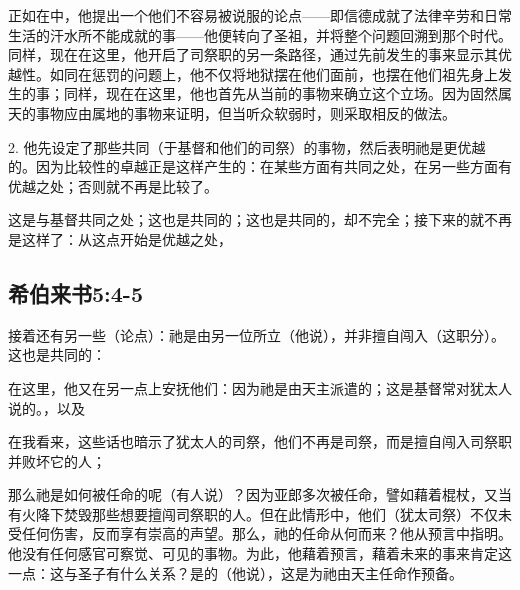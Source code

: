 正如在中，他提出一个他们不容易被说服的论点——即信德成就了法律辛劳和日常生活的汗水所不能成就的事——他便转向了圣祖，并将整个问题回溯到那个时代。同样，现在在这里，他开启了司祭职的另一条路径，通过先前发生的事来显示其优越性。如同在惩罚的问题上，他不仅将地狱摆在他们面前，也摆在他们祖先身上发生的事；同样，现在在这里，他也首先从当前的事物来确立这个立场。因为固然属天的事物应由属地的事物来证明，但当听众软弱时，则采取相反的做法。\par

2. 他先设定了那些共同（于基督和他们的司祭）的事物，然后表明祂是更优越的。因为比较性的卓越正是这样产生的：在某些方面有共同之处，在另一些方面有优越之处；否则就不再是比较了。\par

这是与基督共同之处；这也是共同的；这也是共同的，却不完全；接下来的就不再是这样了：从这点开始是优越之处，\par


\subsection{希伯来书5:4-5}

接着还有另一些（论点）：祂是由另一位所立（他说），并非擅自闯入（这职分）。这也是共同的：\par

在这里，他又在另一点上安抚他们：因为祂是由天主派遣的；这是基督常对犹太人说的。，以及\par

在我看来，这些话也暗示了犹太人的司祭，他们不再是司祭，而是擅自闯入司祭职并败坏它的人；\par

那么祂是如何被任命的呢（有人说）？因为亚郎多次被任命，譬如藉着棍杖，又当有火降下焚毁那些想要擅闯司祭职的人。但在此情形中，他们（犹太司祭）不仅未受任何伤害，反而享有崇高的声望。那么，祂的任命从何而来？他从预言中指明。他没有任何感官可察觉、可见的事物。为此，他藉着预言，藉着未来的事来肯定这一点：这与圣子有什么关系？是的（他说），这是为祂由天主任命作预备。\par

